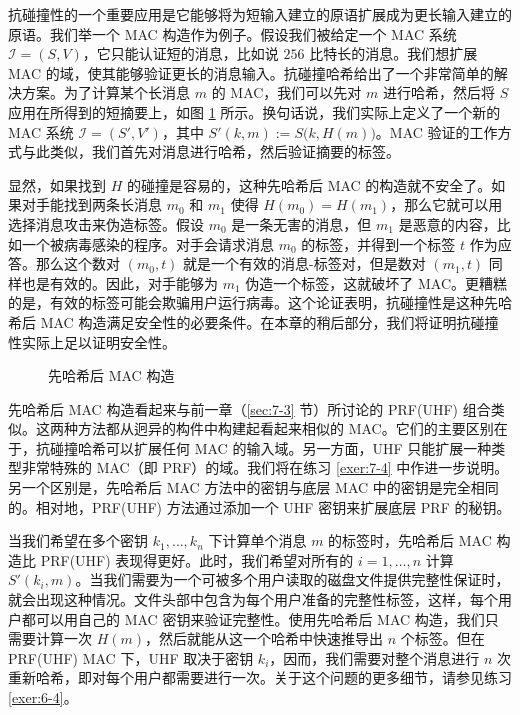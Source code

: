 \begin{snote}[扩展密码学原语。]
抗碰撞性的一个重要应用是它能够将为短输入建立的原语扩展成为更长输入建立的原语。我们举一个 MAC 构造作为例子。假设我们被给定一个 MAC 系统 $\mathcal{I}=(S,V)$，它只能认证短的消息，比如说 $256$ 比特长的消息。我们想扩展 MAC 的域，使其能够验证更长的消息输入。抗碰撞哈希给出了一个非常简单的解决方案。为了计算某个长消息 $m$ 的 MAC，我们可以先对 $m$ 进行哈希，然后将 $S$ 应用在所得到的短摘要上，如图 \ref{fig:8-1} 所示。换句话说，我们实际上定义了一个新的 MAC 系统 $\mathcal{I}=(S',V')$，其中 $S'(k,m):=S\big(k,H(m)\big)$。MAC 验证的工作方式与此类似，我们首先对消息进行哈希，然后验证摘要的标签。

显然，如果找到 $H$ 的碰撞是容易的，这种先哈希后 MAC 的构造就不安全了。如果对手能找到两条长消息 $m_0$ 和 $m_1$ 使得 $H(m_0)=H(m_1)$，那么它就可以用选择消息攻击来伪造标签。假设 $m_0$ 是一条无害的消息，但 $m_1$ 是恶意的内容，比如一个被病毒感染的程序。对手会请求消息 $m_0$ 的标签，并得到一个标签 $t$ 作为应答。那么这个数对 $(m_0,t)$ 就是一个有效的消息-标签对，但是数对 $(m_1,t)$ 同样也是有效的。因此，对手能够为 $m_1$ 伪造一个标签，这就破坏了 MAC。更糟糕的是，有效的标签可能会欺骗用户运行病毒。这个论证表明，抗碰撞性是这种先哈希后 MAC 构造满足安全性的必要条件。在本章的稍后部分，我们将证明抗碰撞性实际上足以证明安全性。

\begin{figure}
	\centering
	
	\caption{先哈希后 MAC 构造}
	\label{fig:8-1}
\end{figure}

先哈希后 MAC 构造看起来与前一章（\ref{sec:7-3} 节）所讨论的 PRF(UHF) 组合类似。这两种方法都从迥异的构件中构建起看起来相似的 MAC。它们的主要区别在于，抗碰撞哈希可以扩展任何 MAC 的输入域。另一方面，UHF 只能扩展一种类型非常特殊的 MAC（即 PRF）的域。我们将在练习 \ref{exer:7-4} 中作进一步说明。另一个区别是，先哈希后 MAC 方法中的密钥与底层 MAC 中的密钥是完全相同的。相对地，PRF(UHF) 方法通过添加一个 UHF 密钥来扩展底层 PRF 的秘钥。

当我们希望在多个密钥 $k_1,\dots,k_n$ 下计算单个消息 $m$ 的标签时，先哈希后 MAC 构造比 PRF(UHF) 表现得更好。此时，我们希望对所有的 $i=1,\dots,n$ 计算 $S'(k_i,m)$。当我们需要为一个可被多个用户读取的磁盘文件提供完整性保证时，就会出现这种情况。文件头部中包含为每个用户准备的完整性标签，这样，每个用户都可以用自己的 MAC 密钥来验证完整性。使用先哈希后 MAC 构造，我们只需要计算一次 $H(m)$，然后就能从这一个哈希中快速推导出 $n$ 个标签。但在 PRF(UHF) MAC 下，UHF 取决于密钥 $k_i$，因而，我们需要对整个消息进行 $n$ 次重新哈希，即对每个用户都需要进行一次。关于这个问题的更多细节，请参见练习 \ref{exer:6-4}。
\end{snote}

